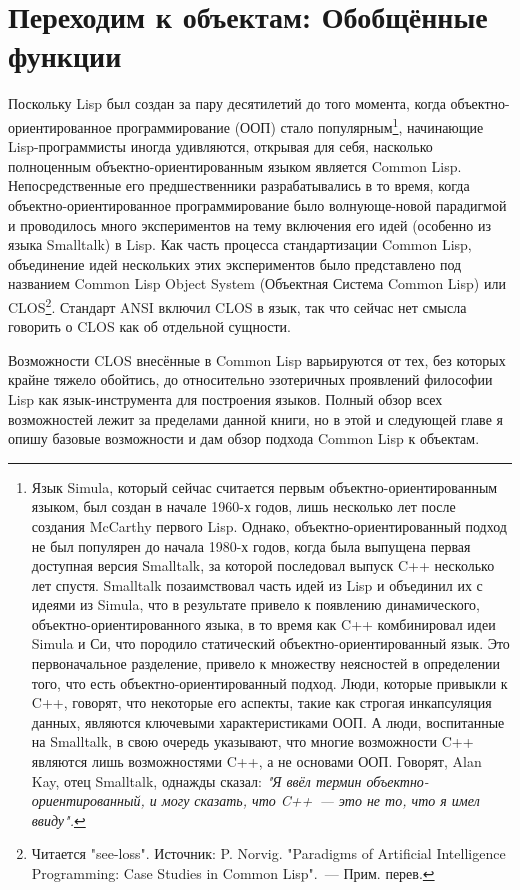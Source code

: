 \chapter{Переходим к объектам: Обобщённые функции}
\label{ch:16}

Поскольку Lisp был создан за пару десятилетий до того момента, когда
объектно-ориентированное программирование (ООП) стало популярным\footnote{Язык Simula,
  который сейчас считается первым объектно-ориентированным языком, был создан в начале
  1960-х годов, лишь несколько лет после создания McCarthy первого Lisp.  Однако,
  объектно-ориентированный подход не был популярен до начала 1980-х годов, когда была
  выпущена первая доступная версия Smalltalk, за которой последовал выпуск C++ несколько
  лет спустя.  Smalltalk позаимствовал часть идей из Lisp и объединил их с идеями из
  Simula, что в результате привело к появлению динамического, объектно-ориентированного
  языка, в то время как C++ комбинировал идеи Simula и Си, что породило статический
  объектно-ориентированный язык. Это первоначальное разделение, привело к множеству
  неясностей в определении того, что есть объектно-ориентированный подход.  Люди, которые
  привыкли к C++, говорят, что некоторые его аспекты, такие как строгая инкапсуляция
  данных, являются ключевыми характеристиками ООП. А люди, воспитанные на Smalltalk, в
  свою очередь указывают, что многие возможности C++ являются лишь возможностями C++, а не
  основами ООП.  Говорят, Alan Kay, отец Smalltalk, однажды сказал: \textit{"Я ввёл термин
    объектно-ориентированный, и могу сказать, что C++~--- это не то, что я имел ввиду".}},
начинающие Lisp-программисты иногда удивляются, открывая для себя, насколько полноценным
объектно-ориентированным языком является Common Lisp.  Непосредственные его
предшественники разрабатывались в то время, когда объектно-ориентированное
программирование было волнующе-новой парадигмой и проводилось много экспериментов на тему
включения его идей (особенно из языка Smalltalk) в Lisp.  Как часть процесса
стандартизации Common Lisp, объединение идей нескольких этих экспериментов было
представлено под названием Common Lisp Object System (Объектная Система Common Lisp) или
CLOS\footnote{Читается "see-loss". Источник: P. Norvig. "Paradigms of Artificial
  Intelligence Programming: Case Studies in Common Lisp".~--- Прим. перев.}. Стандарт ANSI
включил CLOS в язык, так что сейчас нет смысла говорить о CLOS как об отдельной сущности.

Возможности CLOS внесённые в Common Lisp варьируются от тех, без которых крайне тяжело
обойтись, до относительно эзотеричных проявлений философии Lisp как язык-инструмента для
построения языков.  Полный обзор всех возможностей лежит за пределами данной книги, но в
этой и следующей главе я опишу базовые возможности и дам обзор подхода Common Lisp к
объектам.

